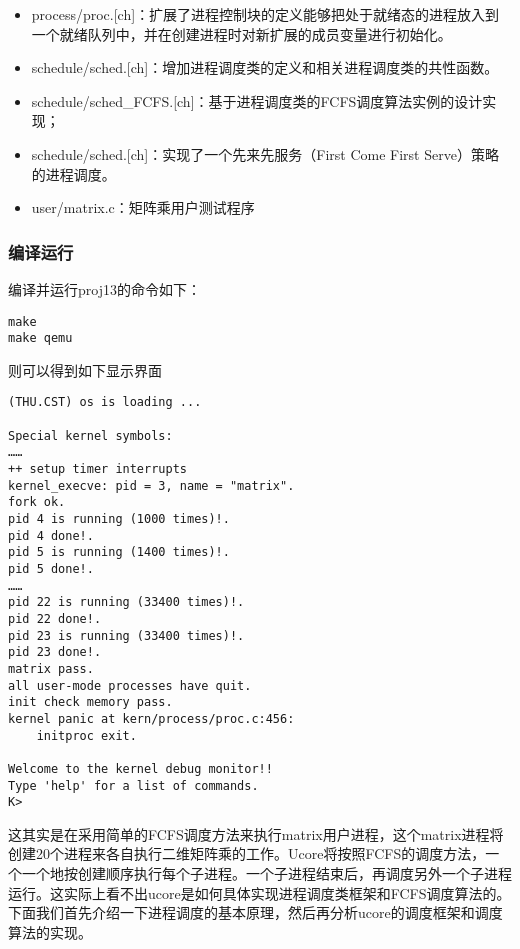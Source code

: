 \begin{itemize}
\item
  process/proc.{[}ch{]}：扩展了进程控制块的定义能够把处于就绪态的进程放入到一个就绪队列中，并在创建进程时对新扩展的成员变量进行初始化。
\item
  schedule/sched.{[}ch{]}：增加进程调度类的定义和相关进程调度类的共性函数。
\item
  schedule/sched\_FCFS.{[}ch{]}：基于进程调度类的FCFS调度算法实例的设计实现；
\item
  schedule/sched.{[}ch{]}：实现了一个先来先服务（First Come First
  Serve）策略的进程调度。
\item
  user/matrix.c：矩阵乘用户测试程序
\end{itemize}

\subsubsection{编译运行}\label{ux7f16ux8bd1ux8fd0ux884c}

编译并运行proj13的命令如下：

\begin{lstlisting}
make
make qemu
\end{lstlisting}

则可以得到如下显示界面

\begin{lstlisting}
(THU.CST) os is loading ...

Special kernel symbols:
……
++ setup timer interrupts
kernel_execve: pid = 3, name = "matrix".
fork ok.
pid 4 is running (1000 times)!.
pid 4 done!.
pid 5 is running (1400 times)!.
pid 5 done!.
……
pid 22 is running (33400 times)!.
pid 22 done!.
pid 23 is running (33400 times)!.
pid 23 done!.
matrix pass.
all user-mode processes have quit.
init check memory pass.
kernel panic at kern/process/proc.c:456:
    initproc exit.

Welcome to the kernel debug monitor!!
Type 'help' for a list of commands.
K>
\end{lstlisting}

这其实是在采用简单的FCFS调度方法来执行matrix用户进程，这个matrix进程将创建20个进程来各自执行二维矩阵乘的工作。Ucore将按照FCFS的调度方法，一个一个地按创建顺序执行每个子进程。一个子进程结束后，再调度另外一个子进程运行。这实际上看不出ucore是如何具体实现进程调度类框架和FCFS调度算法的。下面我们首先介绍一下进程调度的基本原理，然后再分析ucore的调度框架和调度算法的实现。
